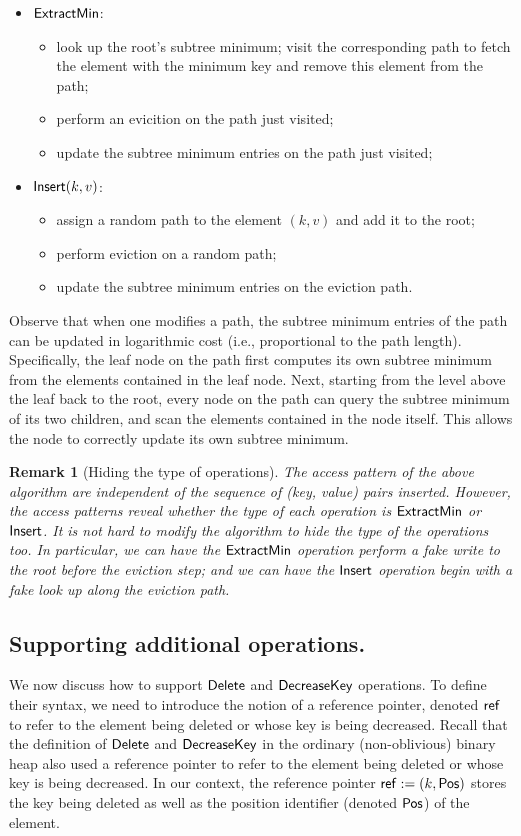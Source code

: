 \documentclass[11pt]{article}
\newtheorem{remark}{Remark}
\begin{document}
\begin{itemize}
\item 
${\sf ExtractMin}$: 
\begin{itemize}
\item 
look up the root's subtree minimum; 
visit the corresponding path
to fetch the element with the minimum key and remove this element from the path;
\item 
perform an evicition on the path just visited;
\item 
update the subtree minimum entries 
on the path just visited;
\end{itemize}
\item 
${\sf Insert}(k, v)$:
\begin{itemize}
\item 
assign a random path to the element $(k, v)$ 
and add it to the root; 
\item 
perform eviction on a random path;
\item 
update the subtree minimum entries 
on the eviction path.
\end{itemize}
\end{itemize}
Observe that when one modifies a path, the subtree minimum entries
of the path can be updated 
in logarithmic cost (i.e., proportional to the path length).
Specifically, the leaf node on the path first computes
its own subtree minimum from the elements contained in the leaf node. 
Next, 
starting from the level above 
the leaf back to the root, 
every node 
on the path can query the subtree minimum 
of its two children, and scan the elements contained in the node itself.
This allows the node to correctly update
its own subtree minimum.

\begin{remark}[Hiding the type of operations]
The access pattern of the above algorithm 
are independent of the 
sequence of (key, value)
pairs inserted. 
However, 
the access patterns reveal whether the type of each operation 
is ${\sf ExtractMin}$
or ${\sf Insert}$.
It is not hard to modify the algorithm to hide
the type of the operations too. 
In particular, we can have the  ${\sf ExtractMin}$ operation 
perform a fake write to the root before the eviction step;
and we can have the ${\sf Insert}$
operation begin with a fake look up 
along the eviction path.
\end{remark}


\subsection{Supporting additional operations.}
We now discuss how to support ${\sf Delete}$ and ${\sf DecreaseKey}$ operations. 
To define their syntax, we need to introduce
the notion of a reference pointer, denoted ${\sf ref}$ to refer
to the element being deleted or whose key is being decreased. 
Recall that   
the definition of ${\sf Delete}$ and ${\sf DecreaseKey}$ in the ordinary (non-oblivious)
binary heap also used a reference pointer to refer to the element
being deleted or whose key is being decreased. 
In our context, the reference pointer ${\sf ref} := (k, {\sf Pos})$
stores the key being deleted as well as the position identifier
(denoted ${\sf Pos}$)
of the element.  
 
\end{document}
